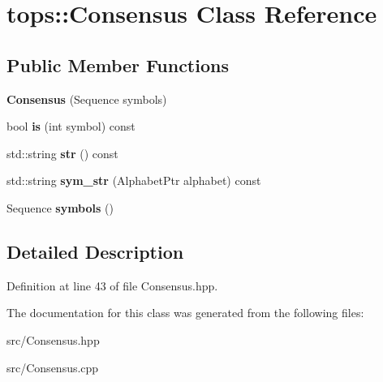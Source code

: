 \hypertarget{classtops_1_1Consensus}{}\section{tops\+:\+:Consensus Class Reference}
\label{classtops_1_1Consensus}
\subsection*{Public Member Functions}
\begin{DoxyCompactItemize}
\item 
\mbox{\label{classtops_1_1Consensus_ad839012e4efb673afb53f6ace90e3f48}} 
{\bfseries Consensus} (Sequence symbols)
\item 
\mbox{\label{classtops_1_1Consensus_a9145e33e3f4c7db499189b27a6aac590}} 
bool {\bfseries is} (int symbol) const
\item 
\mbox{\label{classtops_1_1Consensus_a6d78db9344de69842427cb4f5e175092}} 
std\+::string {\bfseries str} () const
\item 
\mbox{\label{classtops_1_1Consensus_a5a3ea8ba7f3729c21f6d93a2f64da4ab}} 
std\+::string {\bfseries sym\+\_\+str} (Alphabet\+Ptr alphabet) const
\item 
\mbox{\label{classtops_1_1Consensus_a9be79025dbee6313eba4e0289d113e13}} 
Sequence {\bfseries symbols} ()
\end{DoxyCompactItemize}


\subsection{Detailed Description}


Definition at line 43 of file Consensus.\+hpp.



The documentation for this class was generated from the following files\+:\begin{DoxyCompactItemize}
\item 
src/Consensus.\+hpp\item 
src/Consensus.\+cpp\end{DoxyCompactItemize}
